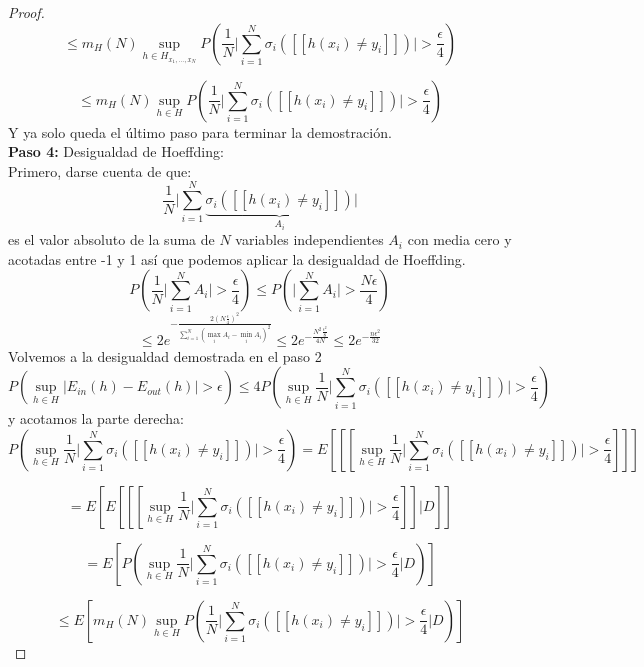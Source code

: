 \begin{proof}
\[ \leq m_{H}(N) \sup_{h \in H_{x_{1},...,x_{N}}} P \left(  \frac{1}{N} \bigg\vert \sum_{i=1}^{N} \sigma_{i} ( [[ h(x_{i}) \neq y_{i} ]])\bigg\vert > \frac{\epsilon}{4}  \right) \]

\[ \leq m_{H}(N) \sup_{h \in H} P \left(  \frac{1}{N} \bigg\vert \sum_{i=1}^{N} \sigma_{i} ( [[ h(x_{i}) \neq y_{i} ]])\bigg\vert > \frac{\epsilon}{4}  \right) \]
Y ya solo queda el último paso para terminar la demostración. \\
\textbf{Paso 4:} Desigualdad de Hoeffding:\\
Primero, darse cuenta de que:
\[ 
\frac{1}{N} \bigg\vert \sum_{i=1}^{N} \underbrace{ \sigma_{i} ( [[ h(x_{i}) \neq y_{i} ]])}_{\text{$A_{i}$}} \bigg\vert 
\]
es el valor absoluto de la suma de $N$ variables independientes $A_{i}$ con media cero y acotadas entre -1 y 1 así que podemos aplicar la desigualdad de Hoeffding.
\[ P \left( \frac{1}{N} \bigg\vert \sum_{i=1}^{N} A_{i} \bigg\vert > \frac{\epsilon}{4} \right) \leq 
P \left( \bigg\vert \sum_{i=1}^{N} A_{i} \bigg\vert > \frac{N\epsilon}{4} \right)\]
\[ \leq 2 e^{ -\frac{2(N \frac{\epsilon}{4})^{2}}{\sum_{i=1}^{N} ( \max_{i} A_{i} - \min_{i} A_{i} )^{2}} } \leq 
2 e^{-\frac{ N^{2} \frac{\epsilon^{2}}{8}  }{4N}} \leq
2 e^{ -\frac{ n\epsilon^{2} }{ 32 } } \]
Volvemos a la desigualdad demostrada en el paso 2
\[ P \left( \sup_{h \in H} \vert E_{in}(h)-E_{out}(h) \vert >\epsilon \right) \leq 4P \left( \sup_{h \in H} \frac{1}{N} \bigg\vert \sum_{i=1}^{N} \sigma_{i} ( [[ h(x_{i}) \neq y_{i} ]])\bigg\vert > \frac{\epsilon}{4} \right) \]
y acotamos la parte derecha:
\[P \left( \sup_{h \in H} \frac{1}{N} \bigg\vert \sum_{i=1}^{N} \sigma_{i} ( [[ h(x_{i}) \neq y_{i} ]])\bigg\vert > \frac{\epsilon}{4} \right) = E \left[ [[ \sup_{h \in H} \frac{1}{N} \bigg\vert \sum_{i=1}^{N} \sigma_{i} ( [[ h(x_{i}) \neq y_{i} ]])\bigg\vert > \frac{\epsilon}{4} ]] \right] \]

\[ = E \left[ E \left[ [[ \sup_{h \in H} \frac{1}{N} \bigg\vert \sum_{i=1}^{N} \sigma_{i} ( [[ h(x_{i}) \neq y_{i} ]])\bigg\vert > \frac{\epsilon}{4} ]] \bigg\vert D \right] \right] \]

\[= E \left[ P \left( \sup_{h \in H} \frac{1}{N} \bigg\vert \sum_{i=1}^{N} \sigma_{i} ( [[ h(x_{i}) \neq y_{i} ]])\bigg\vert > \frac{\epsilon}{4} \bigg\vert D \right) \right]\]

\[ \leq E \left[ m_{H}(N) \sup_{h \in H} P \left( \frac{1}{N} \bigg\vert \sum_{i=1}^{N} \sigma_{i} ( [[ h(x_{i}) \neq y_{i} ]])\bigg\vert > \frac{\epsilon}{4} \bigg\vert D \right) \right] \]


\end{proof}
